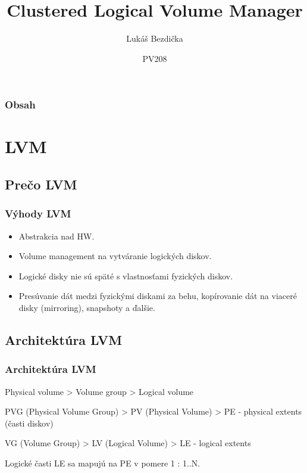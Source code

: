 \documentclass{beamer}
\title[CLVM]
{Clustered Logical Volume Manager}
\author[Bezdička L.]
{Lukáš Bezdička}
\institute[FI MUNI]
{ Fakulta informatiky\\
  Masarykova univerzita}
\date[2011] 
{PV208}
\begin{document}
\begin{frame}
  \titlepage
\end{frame}

\begin{frame}
  \frametitle{Obsah}
  \tableofcontents
\end{frame}

\section{LVM}

\subsection{Prečo LVM}

\begin{frame}
  \frametitle{Výhody LVM}

  \begin{itemize}
  \item Abstrakcia nad HW.
  \item Volume management na vytváranie logických diskov.
  \item Logické disky nie sú späté s vlastnosťami fyzických diskov.
  \item Presúvanie dát medzi fyzickými diskami za behu, kopírovanie dát na viaceré disky (mirroring), snapshoty a ďalšie.
  \end{itemize}
\end{frame}

\subsection{Architektúra LVM}

\begin{frame}
  \frametitle{Architektúra LVM}
  Physical volume > Volume group > Logical volume
\end{frame}

\begin{frame}
PVG (Physical Volume Group) > PV (Physical Volume) > PE - physical extents (časti diskov)
\end{frame}

\begin{frame}
VG (Volume Group) > LV (Logical Volume) > LE - logical extents
\end{frame}

\begin{frame}
Logické časti LE sa mapujú na PE v pomere 1 : 1..N.
\end{frame}
\end{document}
